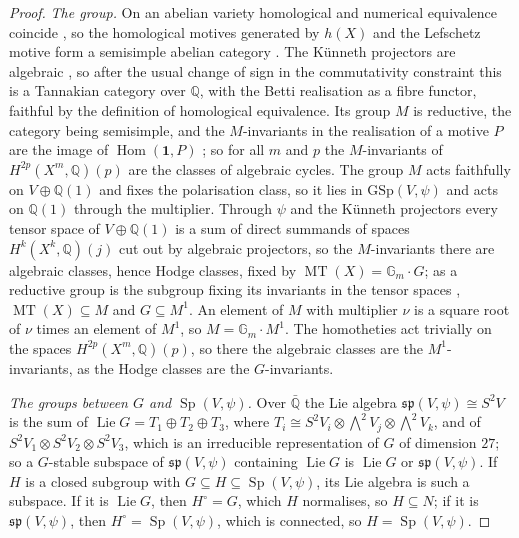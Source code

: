\documentclass[11pt,reqno]{amsart}
\theoremstyle{plain}
\theoremstyle{definition}
\theoremstyle{remark}
\newcommand{\QQ}{\mathbb{Q}}
\DeclareMathOperator{\Hom}{Hom}
\DeclareMathOperator{\MT}{MT}
\DeclareMathOperator{\Sp}{Sp}
\begin{document}
\begin{proof}
\emph{The group.} On an abelian variety homological and numerical
equivalence coincide \cite{Lie68}, so the homological motives generated by
$h(X)$ and the Lefschetz motive form a semisimple abelian category
\cite{Jan92}. The K\"unneth projectors are algebraic \cite[\S2]{Kle68}, so
after the usual change of sign in the commutativity constraint this is a
Tannakian category over $\QQ$, with the Betti realisation as a fibre functor,
faithful by the definition of homological equivalence. Its group $M$ is
reductive, the category being semisimple, and the $M$-invariants in the
realisation of a motive $P$ are the image of $\Hom(\mathbf{1},P)$
\cite[Theorem~2.11]{DM82}; so for all $m$ and $p$ the $M$-invariants of
$H^{2p}(X^{m},\QQ)(p)$ are the classes of algebraic cycles. The group $M$ acts
faithfully on $V\oplus\QQ(1)$ and fixes the polarisation class, so it lies in
$\mathrm{GSp}(V,\psi)$ and acts on $\QQ(1)$ through the multiplier. Through
$\psi$ and the K\"unneth projectors every tensor space of $V\oplus\QQ(1)$ is a
sum of direct summands of spaces $H^{k}(X^{k},\QQ)(j)$ cut out by algebraic
projectors, so the $M$-invariants there are algebraic classes, hence Hodge
classes, fixed by $\MT(X)=\mathbb{G}_{m}\cdot G$; as a reductive group is the
subgroup fixing its invariants in the tensor spaces
\cite[Proposition~3.1]{Del82}, $\MT(X)\subseteq M$ and $G\subseteq M^{1}$. An
element of $M$ with multiplier $\nu$ is a square root of $\nu$ times an
element of $M^{1}$, so $M=\mathbb{G}_{m}\cdot M^{1}$. The homotheties act
trivially on the spaces $H^{2p}(X^{m},\QQ)(p)$, so there the algebraic classes
are the $M^{1}$-invariants, as the Hodge classes are the $G$-invariants.

\emph{The groups between $G$ and $\Sp(V,\psi)$.} Over $\bar{\QQ}$ the Lie
algebra $\mathfrak{sp}(V,\psi)\cong S^{2}V$ is the sum of
$\operatorname{Lie}G=T_{1}\oplus T_{2}\oplus T_{3}$, where $T_{i}\cong
S^{2}V_{i}\otimes{\textstyle\bigwedge^{2}}V_{j}\otimes{\textstyle\bigwedge^{2}}V_{k}$, and of
$S^{2}V_{1}\otimes S^{2}V_{2}\otimes S^{2}V_{3}$, which is an irreducible
representation of $G$ of dimension $27$; so a $G$-stable subspace of
$\mathfrak{sp}(V,\psi)$ containing $\operatorname{Lie}G$ is
$\operatorname{Lie}G$ or $\mathfrak{sp}(V,\psi)$. If $H$ is a closed
subgroup with $G\subseteq H\subseteq\Sp(V,\psi)$, its Lie algebra is such a
subspace. If it is $\operatorname{Lie}G$, then $H^{\circ}=G$, which $H$
normalises, so $H\subseteq N$; if it is $\mathfrak{sp}(V,\psi)$, then
$H^{\circ}=\Sp(V,\psi)$, which is connected, so $H=\Sp(V,\psi)$.


\end{proof}
\end{document}
